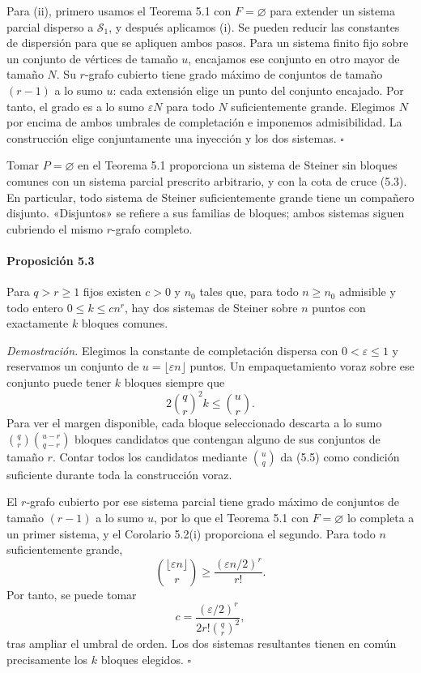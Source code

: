 \documentclass[spanish,11pt,a4paper]{article}
\begin{document}
Para (ii), primero usamos el Teorema 5.1 con \(F=\varnothing\) para extender un sistema parcial disperso a \(\mathcal S_1\), y después aplicamos (i). Se pueden reducir las constantes de dispersión para que se apliquen ambos pasos. Para un sistema finito fijo sobre un conjunto de vértices de tamaño \(u\), encajamos ese conjunto en otro mayor de tamaño \(N\). Su \(r\)-grafo cubierto tiene grado máximo de conjuntos de tamaño \((r-1)\) a lo sumo \(u\): cada extensión elige un punto del conjunto encajado. Por tanto, el grado es a lo sumo \(\varepsilon N\) para todo \(N\) suficientemente grande. Elegimos \(N\) por encima de ambos umbrales de completación e imponemos admisibilidad. La construcción elige conjuntamente una inyección y los dos sistemas. \(\square\)

Tomar \(P=\varnothing\) en el Teorema 5.1 proporciona un sistema de Steiner sin bloques comunes con un sistema parcial prescrito arbitrario, y con la cota de cruce (5.3). En particular, todo sistema de Steiner suficientemente grande tiene un compañero disjunto. «Disjuntos» se refiere a sus familias de bloques; ambos sistemas siguen cubriendo el mismo \(r\)-grafo completo.

\par
\begin{samepage}
\paragraph{Proposición 5.3}\label{proposiciuxf3n-5.3}

Para \(q>r\ge1\) fijos existen \(c>0\) y \(n_0\) tales que, para todo \(n\ge n_0\) admisible y todo entero \(0\le k\le c n^r\), hay dos sistemas de Steiner sobre \(n\) puntos con exactamente \(k\) bloques comunes.

\end{samepage}
\emph{Demostración.} Elegimos la constante de completación dispersa con \(0<\varepsilon\le1\) y reservamos un conjunto de \(u=\lfloor\varepsilon n\rfloor\) puntos. Un empaquetamiento voraz sobre ese conjunto puede tener \(k\) bloques siempre que \[2\binom qr^2 k\le\binom ur.
\tag{5.5}\] Para ver el margen disponible, cada bloque seleccionado descarta a lo sumo \(\binom qr\binom{u-r}{q-r}\) bloques candidatos que contengan alguno de sus conjuntos de tamaño \(r\). Contar todos los candidatos mediante \(\binom uq\) da (5.5) como condición suficiente durante toda la construcción voraz.

El \(r\)-grafo cubierto por ese sistema parcial tiene grado máximo de conjuntos de tamaño \((r-1)\) a lo sumo \(u\), por lo que el Teorema 5.1 con \(F=\varnothing\) lo completa a un primer sistema, y el Corolario 5.2(i) proporciona el segundo. Para todo \(n\) suficientemente grande, \[\binom{\lfloor\varepsilon n\rfloor}{r}
\ge\frac{(\varepsilon n/2)^r}{r!}.\] Por tanto, se puede tomar \[c=\frac{(\varepsilon/2)^r}{2r!\binom qr^2},
\tag{5.6}\] tras ampliar el umbral de orden. Los dos sistemas resultantes tienen en común precisamente los \(k\) bloques elegidos. \(\square\)
\end{document}
